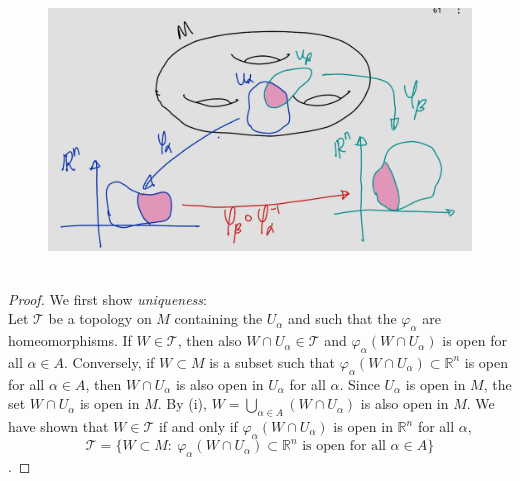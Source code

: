 \documentclass[
]{book}
\theoremstyle{definition}
\theoremstyle{definition}
\theoremstyle{definition}
\theoremstyle{definition}
\theoremstyle{remark}
\begin{document}
\begin{figure}
\centering
\includegraphics{figures/ch1/fig09.png}
\caption{\label{fig:fig09}\(~\)}
\end{figure}

\begin{proof}
We first show \emph{uniqueness}:\\
Let \(\mathcal{T}\) be a topology on \(M\) containing the \(U_\alpha\) and such that the \(\varphi_\alpha\) are homeomorphisms.
If \(W \in \mathcal{T}\), then also \(W \cap U_\alpha \in \mathcal{T}\) and \(\varphi_\alpha(W \cap U_\alpha)\) is open for all \(\alpha \in A\).
Conversely, if \(W \subset M\) is a subset such that \(\varphi_\alpha(W \cap U_\alpha) \subset \mathbb{R}^n\) is open for all \(\alpha \in A\), then
\(W \cap U_\alpha\) is also open in \(U_\alpha\) for all \(\alpha\). Since \(U_\alpha\) is open in \(M\), the set \(W \cap U_\alpha\) is open in \(M\).
By (i), \(W = \bigcup_{\alpha \in A} (W \cap U_\alpha)\) is also open in \(M\). We have shown that \(W \in \mathcal{T}\) if and only
if \(\varphi_\alpha(W \cap U_\alpha)\) is open in \(\mathbb{R}^n\) for all \(\alpha\),
\[\mathcal{T} = \{W \subset M :~ \varphi_\alpha(W \cap U_\alpha) \subset \mathbb{R}^n \text{ is open for all } \alpha \in A\}\].
\end{proof}
\end{document}
